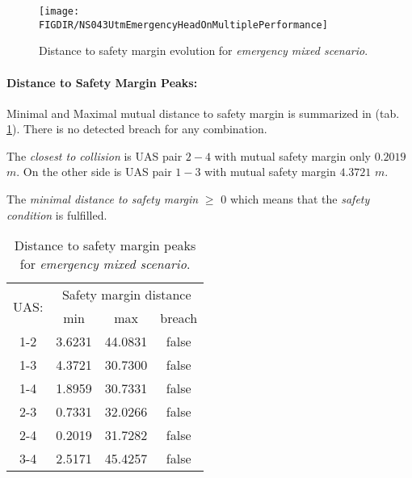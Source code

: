     \begin{figure}[H]
        \centering
        \texttt{[image: \\FIGDIR/NS043UtmEmergencyHeadOnMultiplePerformance]} 
        \caption{Distance to safety margin evolution for \emph{emergency mixed scenario}.}
        \label{fig:testCaseMultipleAvoidancePerformance}
    \end{figure}
    
    \paragraph{Distance to Safety Margin Peaks:} Minimal and Maximal mutual distance to safety margin is summarized in (tab. \ref{tab:testCaseEmergencyMixedSafetyMarginDistances}). There is no detected breach for any combination. 
    
    The \emph{closest to collision} is UAS pair $2-4$ with mutual safety margin only $0.2019$ $m$. On the other side is UAS pair $1-3$ with mutual safety margin $4.3721$ $m$. 
    
    The \emph{minimal distance to safety margin}  $\ge$ 0 which means that the \emph{safety condition} is fulfilled. 
    
    \begin{table}[H]
        \centering
        \begin{tabular}{c||c|c|c}
            \multirow{2}{*}{UAS:} & \multicolumn{3}{c}{Safety margin distance} \\ \cline{2-4} 
                      & min          & max         & breach         \\ \hline\hline
                1-2   & 3.6231       & 44.0831     & false          \\ \hline
                1-3   & 4.3721       & 30.7300     & false          \\ \hline
                1-4   & 1.8959       & 30.7331     & false          \\ \hline
                2-3   & 0.7331       & 32.0266     & false          \\ \hline
                2-4   & 0.2019       & 31.7282     & false          \\ \hline
                3-4   & 2.5171       & 45.4257     & false          \\ 
        \end{tabular}
        \caption{Distance to safety margin peaks for \emph{emergency mixed scenario}.}
        \label{tab:testCaseEmergencyMixedSafetyMarginDistances}
    \end{table}
    
